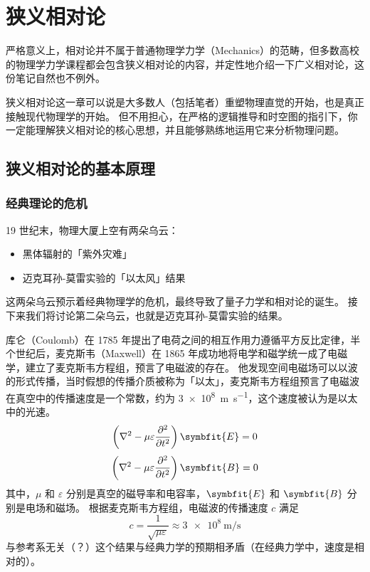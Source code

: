 \chapter{狭义相对论}\label{chap:special-relativity}

\begin{intro}
    严格意义上，相对论并不属于普通物理学力学（Mechanics）的范畴，但多数高校的物理学力学课程都会包含狭义相对论的内容，并定性地介绍一下广义相对论，这份笔记自然也不例外。

    狭义相对论这一章可以说是大多数人（包括笔者）重塑物理直觉的开始，也是真正接触现代物理学的开始。
    但不用担心，在严格的逻辑推导和时空图的指引下，你一定能理解狭义相对论的核心思想，并且能够熟练地运用它来分析物理问题。
\end{intro}

\section{狭义相对论的基本原理}

\subsection{经典理论的危机}

19 世纪末，物理大厦上空有两朵乌云：
\begin{itemize}
    \item 黑体辐射的「紫外灾难」
    \item 迈克耳孙-莫雷实验的「以太风」结果
\end{itemize}
这两朵乌云预示着经典物理学的危机，最终导致了量子力学和相对论的诞生。
接下来我们将讨论第二朵乌云，也就是迈克耳孙-莫雷实验的结果。

库仑（Coulomb）在 1785 年提出了电荷之间的相互作用力遵循平方反比定律，半个世纪后，麦克斯韦（Maxwell）在 1865 年成功地将电学和磁学统一成了电磁学，建立了麦克斯韦方程组，预言了电磁波的存在。
他发现空间电磁场可以以波的形式传播，当时假想的传播介质被称为「以太」，麦克斯韦方程组预言了电磁波在真空中的传播速度是一个常数，约为 \qty{3e8}{\metre\per\second}，这个速度被认为是以太中的光速。
\begin{equation}
    \left(\nabla^2 - \mu \varepsilon \frac{\partial^2}{\partial t^2}\right) \symbfit{E} = 0
\end{equation}
\begin{equation}
    \left(\nabla^2 - \mu \varepsilon \frac{\partial^2}{\partial t^2}\right) \symbfit{B} = 0
\end{equation}
其中，$ \mu $ 和 $ \varepsilon $ 分别是真空的磁导率和电容率，$ \symbfit{E} $ 和 $ \symbfit{B} $ 分别是电场和磁场。
根据麦克斯韦方程组，电磁波的传播速度 $ c $ 满足
\begin{equation}
    c = \frac{1}{\sqrt{\mu \varepsilon}} \approx \qty{3e8}{\metre\per\second}
\end{equation}
与参考系无关（？）这个结果与经典力学的预期相矛盾（在经典力学中，速度是相对的）。

